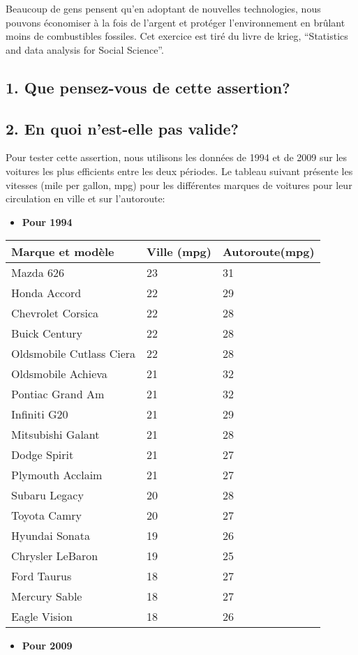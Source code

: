 \documentclass[
]{article}
\providecommand{\tightlist}{%
  \setlength{\itemsep}{0pt}\setlength{\parskip}{0pt}}
\begin{document}
Beaucoup de gens pensent qu'en adoptant de nouvelles technologies, nous
pouvons économiser à la fois de l'argent et protéger l'environnement en
brûlant moins de combustibles fossiles. Cet exercice est tiré du livre
de krieg, ``Statistics and data analysis for Social Science''.

\hypertarget{que-pensez-vous-de-cette-assertion}{%
\subsection{1. Que pensez-vous de cette
assertion?}\label{que-pensez-vous-de-cette-assertion}}

\hypertarget{en-quoi-nest-elle-pas-valide}{%
\subsection{2. En quoi n'est-elle pas
valide?}\label{en-quoi-nest-elle-pas-valide}}

Pour tester cette assertion, nous utilisons les données de 1994 et de
2009 sur les voitures les plus efficients entre les deux périodes. Le
tableau suivant présente les vitesses (mile per gallon, mpg) pour les
différentes marques de voitures pour leur circulation en ville et sur
l'autoroute:

\begin{itemize}
\tightlist
\item
  \textbf{Pour 1994}
\end{itemize}

\begin{longtable}[]{@{}lll@{}}
\toprule
Marque et modèle & Ville (mpg) & Autoroute(mpg)\tabularnewline
\midrule
\endhead
Mazda 626 & 23 & 31\tabularnewline
Honda Accord & 22 & 29\tabularnewline
Chevrolet Corsica & 22 & 28\tabularnewline
Buick Century & 22 & 28\tabularnewline
Oldsmobile Cutlass Ciera & 22 & 28\tabularnewline
Oldsmobile Achieva & 21 & 32\tabularnewline
Pontiac Grand Am & 21 & 32\tabularnewline
Infiniti G20 & 21 & 29\tabularnewline
Mitsubishi Galant & 21 & 28\tabularnewline
Dodge Spirit & 21 & 27\tabularnewline
Plymouth Acclaim & 21 & 27\tabularnewline
Subaru Legacy & 20 & 28\tabularnewline
Toyota Camry & 20 & 27\tabularnewline
Hyundai Sonata & 19 & 26\tabularnewline
Chrysler LeBaron & 19 & 25\tabularnewline
Ford Taurus & 18 & 27\tabularnewline
Mercury Sable & 18 & 27\tabularnewline
Eagle Vision & 18 & 26\tabularnewline
\bottomrule
\end{longtable}

\begin{itemize}
\tightlist
\item
  \textbf{Pour 2009}
\end{itemize}
\end{document}
